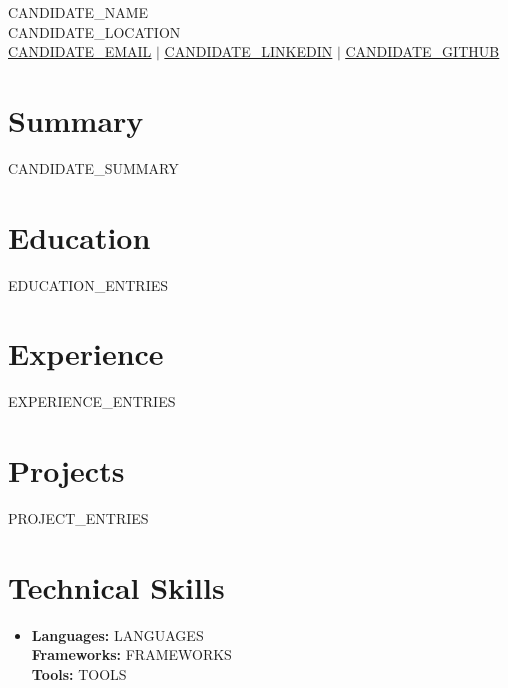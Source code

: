 \documentclass[letterpaper,10pt]{article}
\newcommand{\resumeSubHeadingListStart}{\begin{itemize}[leftmargin=0.15in, label={}]}
\newcommand{\resumeSubHeadingListEnd}{\end{itemize}}
\begin{document}
\begin{center}
    {\Large \scshape CANDIDATE_NAME} \\ \vspace{2pt}
    CANDIDATE_LOCATION \\ \vspace{1pt}
    \small \href{mailto:CANDIDATE_EMAIL}{\underline{CANDIDATE_EMAIL}} $|$
    \href{CANDIDATE_LINKEDIN}{\underline{CANDIDATE_LINKEDIN}} $|$
    \href{CANDIDATE_GITHUB}{\underline{CANDIDATE_GITHUB}}
\end{center}

\section{Summary}
CANDIDATE_SUMMARY

\section{Education}
\resumeSubHeadingListStart
EDUCATION_ENTRIES
\resumeSubHeadingListEnd

\section{Experience}
\resumeSubHeadingListStart
EXPERIENCE_ENTRIES
\resumeSubHeadingListEnd

\section{Projects}
\resumeSubHeadingListStart
PROJECT_ENTRIES
\resumeSubHeadingListEnd

\section{Technical Skills}
\begin{itemize}[leftmargin=0.15in, label={}]
\item \small{
    \textbf{Languages:} LANGUAGES \\
    \textbf{Frameworks:} FRAMEWORKS \\
    \textbf{Tools:} TOOLS
}
\end{itemize}
\end{document}
